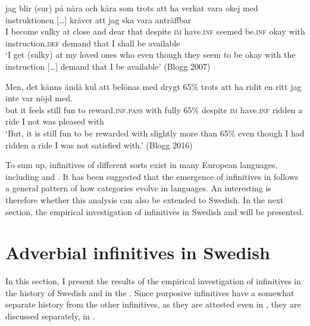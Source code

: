 \documentclass[output=paper]{langscibook}
\begin{document}
\ea
\label{ex:kalm:7}
\ea  \label{ex:kalm:7a}
\gll jag blir (sur) på nära och kära som trots att ha verkat vara okej med {instruktionen […]} kräver att jag ska vara anträffbar\\
I become sulky at close and dear that despite \textsc{im} have.\textsc{inf} seemed be.\textsc{inf} okay with instruction.\textsc{def} demand that I shall be available\\ 
\glt ‘I get (sulky) at my loved ones who even though they seem to be okay with the instruction […] demand that I be available’ (Blogg 2007)

\ex  \label{ex:kalm:7b}
\gll Men, det känns ändå kul att belönas med drygt 65\% trots att ha ridit en ritt jag inte var nöjd med.\\
but it feels still fun to reward.\textsc{inf.pass} with fully 65\% despite \textsc{im} have.\textsc{inf} ridden a ride I not was pleased with\\ 
\glt ‘But, it is still fun to be rewarded with slightly more than 65\% even though I had ridden a ride I was not satisfied with.’ (Blogg 2016)
\z 
\z 



To sum up,  infinitives of different sorts exist in many European languages, including  and . It has been suggested that the emergence of  infinitives in  follows a general pattern of how  categories evolve in languages. An interesting  is therefore whether this analysis can also be extended to Swedish. In the next section, the empirical investigation of  infinitives in Swedish and  will be presented. 


\section{Adverbial infinitives in Swedish}\label{sec:kalm:4}
In this section, I present the results of the empirical investigation of  infinitives in the history of Swedish and in the  . Since purposive infinitives have a somewhat separate history from the other  infinitives, as they are attested even in , they are discussed separately, in .
\end{document}
